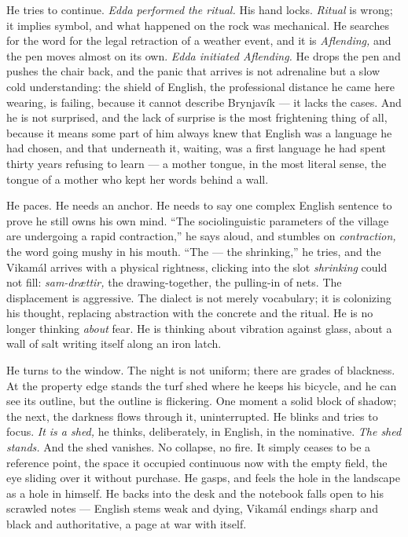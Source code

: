 \documentclass[11pt,oneside]{book}
\begin{document}
He tries to continue. \emph{Edda performed the ritual.} His hand locks.
\emph{Ritual} is wrong; it implies symbol, and what happened on the rock
was mechanical. He searches for the word for the legal retraction of a
weather event, and it is \emph{Aflending,} and the pen moves almost on
its own. \emph{Edda initiated Aflending.} He drops the pen and pushes
the chair back, and the panic that arrives is not adrenaline but a slow
cold understanding: the shield of English, the professional distance he
came here wearing, is failing, because it cannot describe Brynjavík ---
it lacks the cases. And he is not surprised, and the lack of surprise is
the most frightening thing of all, because it means some part of him
always knew that English was a language he had chosen, and that
underneath it, waiting, was a first language he had spent thirty years
refusing to learn --- a mother tongue, in the most literal sense, the
tongue of a mother who kept her words behind a wall.

He paces. He needs an anchor. He needs to say one complex English
sentence to prove he still owns his own mind. ``The sociolinguistic
parameters of the village are undergoing a rapid contraction,'' he says
aloud, and stumbles on \emph{contraction,} the word going mushy in his
mouth. ``The --- the shrinking,'' he tries, and the Vikamál arrives with
a physical rightness, clicking into the slot \emph{shrinking} could not
fill: \emph{sam-drættir,} the drawing-together, the pulling-in of nets.
The displacement is aggressive. The dialect is not merely vocabulary; it
is colonizing his thought, replacing abstraction with the concrete and
the ritual. He is no longer thinking \emph{about} fear. He is thinking
about vibration against glass, about a wall of salt writing itself along
an iron latch.

He turns to the window. The night is not uniform; there are grades of
blackness. At the property edge stands the turf shed where he keeps his
bicycle, and he can see its outline, but the outline is flickering. One
moment a solid block of shadow; the next, the darkness flows through it,
uninterrupted. He blinks and tries to focus. \emph{It is a shed,} he
thinks, deliberately, in English, in the nominative. \emph{The shed
stands.} And the shed vanishes. No collapse, no fire. It simply ceases
to be a reference point, the space it occupied continuous now with the
empty field, the eye sliding over it without purchase. He gasps, and
feels the hole in the landscape as a hole in himself. He backs into the
desk and the notebook falls open to his scrawled notes --- English stems
weak and dying, Vikamál endings sharp and black and authoritative, a
page at war with itself.
\end{document}
